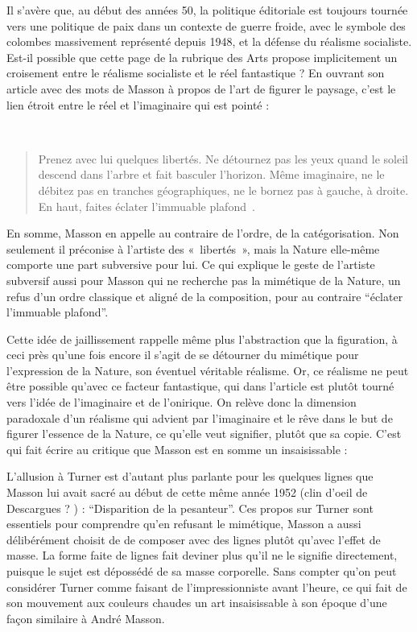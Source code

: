 	Il s'avère que, au début des années 50, la politique éditoriale est toujours tournée vers une politique de paix dans un contexte de guerre froide, avec le symbole des colombes massivement représenté depuis 1948, et la défense du réalisme socialiste. Est-il possible que cette page de la rubrique des Arts propose implicitement un croisement entre le réalisme socialiste et le réel fantastique ? En ouvrant son article avec des mots de Masson à propos de l’art de figurer le paysage, c’est le lien étroit entre le réel et l’imaginaire qui est pointé : 

 \begin{quote}
Prenez avec lui quelques libertés. Ne détournez pas les yeux quand le soleil descend dans l’arbre et fait basculer l’horizon. Même imaginaire, ne le débitez pas en tranches géographiques, ne le bornez pas à gauche, à droite. En haut, faites éclater l’immuable plafond .	
\end{quote}

	 En somme, Masson en appelle au contraire de l’ordre, de la catégorisation. Non seulement il préconise à l’artiste des « libertés », mais la Nature elle-même comporte une part subversive pour lui. Ce qui explique le geste de l’artiste subversif aussi pour Masson qui ne recherche pas la mimétique de la Nature, un refus d’un ordre classique et aligné de la composition, pour au contraire \enquote{éclater l’immuable plafond}.

	  Cette idée de jaillissement rappelle même plus l’abstraction que la figuration, à ceci près qu’une fois encore il s’agit de se détourner du mimétique pour l’expression de la Nature, son éventuel véritable réalisme. Or, ce réalisme ne peut être possible qu’avec ce facteur fantastique, qui dans l’article est plutôt tourné vers l’idée de l’imaginaire et de l’onirique. On relève donc la dimension paradoxale d’un réalisme qui advient par l’imaginaire et le rêve dans le but de figurer l’essence de la Nature, ce qu’elle veut signifier, plutôt que sa copie. C’est qui fait écrire au critique que Masson est en somme un insaisissable : 
 
L’allusion à Turner est d’autant plus parlante pour les quelques lignes que Masson lui avait sacré au début de cette même année 1952 (clin d’oeil de Descargues ? ) : \enquote{Disparition de la pesanteur}. Ces propos sur Turner sont essentiels pour comprendre qu’en refusant le mimétique, Masson a aussi délibérément choisit de de composer avec des lignes plutôt qu’avec l’effet de masse. La forme faite de lignes fait deviner plus qu’il ne le signifie directement, puisque le sujet est dépossédé de sa masse corporelle. Sans compter qu’on peut considérer Turner comme faisant de l’impressionniste avant l’heure, ce qui fait de son mouvement aux couleurs chaudes un art insaisissable à son époque d’une façon similaire à André Masson. 

